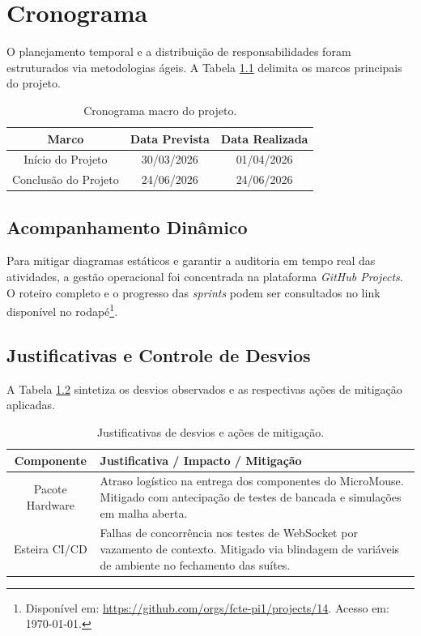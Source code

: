 \chapter{Cronograma}
\vspace{-1cm}
O planejamento temporal e a distribuição de responsabilidades foram estruturados via metodologias ágeis. A Tabela \ref{tab:cronograma_geral} delimita os marcos principais do projeto.

\begin{table}[htpb]
\centering
\caption{Cronograma macro do projeto.}
\label{tab:cronograma_geral}
\begin{tabular}{|c|c|c|}
\hline
\textbf{Marco}       & \textbf{Data Prevista} & \textbf{Data Realizada} \\ \hline
Início do Projeto    & 30/03/2026            & 01/04/2026             \\ \hline
Conclusão do Projeto & 24/06/2026            & 24/06/2026             \\ \hline
\end{tabular}
\end{table}

\section{Acompanhamento Dinâmico}

Para mitigar diagramas estáticos e garantir a auditoria em tempo real das atividades, a gestão operacional foi concentrada na plataforma \textit{GitHub Projects}. O roteiro completo e o progresso das \textit{sprints} podem ser consultados no link disponível no rodapé\footnote{Disponível em: \url{https://github.com/orgs/fcte-pi1/projects/14}. Acesso em: \today.}.

\section{Justificativas e Controle de Desvios}

A Tabela \ref{tab:justificativas_atraso} sintetiza os desvios observados e as respectivas ações de mitigação aplicadas.

\begin{table}[htpb]
\centering
\caption{Justificativas de desvios e ações de mitigação.}
\label{tab:justificativas_atraso}
\begin{tabular}{|c|p{9.5cm}|} 
\hline
\textbf{Componente} & \textbf{Justificativa / Impacto / Mitigação} \\ \hline 
Pacote Hardware     & Atraso logístico na entrega dos componentes do MicroMouse. Mitigado com antecipação de testes de bancada e simulações em malha aberta. \\ \hline
Esteira CI/CD       & Falhas de concorrência nos testes de WebSocket por vazamento de contexto. Mitigado via blindagem de variáveis de ambiente no fechamento das suítes. \\ \hline
\end{tabular}
\end{table}